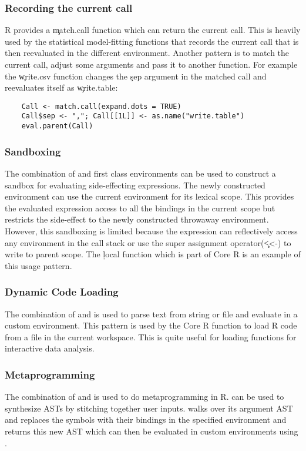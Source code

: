 \documentclass[USenglish,cleveref, autoref, thm-restate]{lipics-v2019}
\begin{document}
\subsubsection{Recording the current call}
R provides a \c{match.call} function which can return the current
call. This is heavily used by the statistical model-fitting functions
that records the current call that is then reevaluated in the
different environment. Another pattern is to match the current call,
adjust some arguments and pass it to another function. For example the
\c{write.csv} function changes the \c{sep} argument in the matched
call and reevaluates itself as \c{write.table}:
%
\begin{lstlisting}
    Call <- match.call(expand.dots = TRUE)
    Call$sep <- ","; Call[[1L]] <- as.name("write.table")
    eval.parent(Call)
\end{lstlisting}

\subsubsection{Sandboxing} The combination of \eval and first class
environments can be used to construct a sandbox for evaluating
side-effecting expressions. The newly constructed environment can use
the current environment for its lexical scope. This provides the
evaluated expression access to all the bindings in the current scope
but restricts the side-effect to the newly constructed throwaway
environment. However, this sandboxing is limited because the
expression can reflectively access any environment in the call stack
or use the super assignment operator(\c{<<-}) to write to parent
scope. The \c{local} function which is part of Core R is an example of
this usage pattern.

\subsubsection{Dynamic Code Loading}
The combination of \parse and \eval is used to parse text from string
or file and evaluate in a custom environment. This pattern is used by
the \source Core R function to load R code from a file in the current
workspace. This is quite useful for loading functions for interactive
data analysis.

\subsubsection{Metaprogramming}
The combination of \eval and \substitute is used to do metaprogramming
in R. \substitute can be used to synthesize ASTs by stitching together
user inputs. \substitute walks over its argument AST and replaces the
symbols with their bindings in the specified environment and returns
this new AST which can then be evaluated in custom environments using
\eval.
\end{document}
